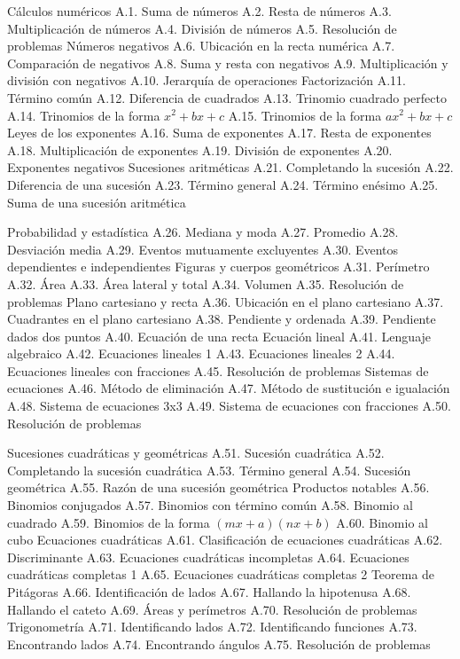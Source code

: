 Cálculos numéricos
A.1. Suma de números
A.2. Resta de números
A.3. Multiplicación de números
A.4. División de números
A.5. Resolución de problemas
Números negativos
A.6. Ubicación en la recta numérica
A.7. Comparación de negativos
A.8. Suma y resta con negativos
A.9. Multiplicación y división con negativos
A.10. Jerarquía de operaciones
Factorización
A.11. Término común
A.12. Diferencia de cuadrados
A.13. Trinomio cuadrado perfecto
A.14. Trinomios de la forma $x^2+bx+c$
A.15. Trinomios de la forma $ax^2+bx+c$
Leyes de los exponentes
A.16. Suma de exponentes
A.17. Resta de exponentes
A.18. Multiplicación de exponentes
A.19. División de exponentes
A.20. Exponentes negativos
Sucesiones aritméticas
A.21. Completando la sucesión
A.22. Diferencia de una sucesión
A.23. Término general
A.24. Término enésimo
A.25. Suma de una sucesión aritmética

Probabilidad y estadística
A.26. Mediana y moda
A.27. Promedio
A.28. Desviación media
A.29. Eventos mutuamente excluyentes
A.30. Eventos dependientes e independientes
Figuras y cuerpos geométricos
A.31. Perímetro
A.32. Área
A.33. Área lateral y total
A.34. Volumen
A.35. Resolución de problemas
Plano cartesiano y recta
A.36. Ubicación en el plano cartesiano
A.37. Cuadrantes en el plano cartesiano
A.38. Pendiente y ordenada
A.39. Pendiente dados dos puntos
A.40. Ecuación de una recta
Ecuación lineal
A.41. Lenguaje algebraico
A.42. Ecuaciones lineales 1
A.43. Ecuaciones lineales 2
A.44. Ecuaciones lineales con fracciones
A.45. Resolución de problemas
Sistemas de ecuaciones
A.46. Método de eliminación
A.47. Método de sustitución e igualación
A.48. Sistema de ecuaciones 3x3
A.49. Sistema de ecuaciones con fracciones
A.50. Resolución de problemas

Sucesiones cuadráticas y geométricas
A.51. Sucesión cuadrática
A.52. Completando la sucesión cuadrática
A.53. Término general
A.54. Sucesión geométrica
A.55. Razón de una sucesión geométrica
Productos notables
A.56. Binomios conjugados
A.57. Binomios con término común
A.58. Binomio al cuadrado
A.59. Binomios de la forma $(mx+a)(nx+b)$
A.60. Binomio al cubo
Ecuaciones cuadráticas
A.61. Clasificación de ecuaciones cuadráticas
A.62. Discriminante
A.63. Ecuaciones cuadráticas incompletas
A.64. Ecuaciones cuadráticas completas 1
A.65. Ecuaciones cuadráticas completas 2
Teorema de Pitágoras
A.66. Identificación de lados
A.67. Hallando la hipotenusa
A.68. Hallando el cateto
A.69. Áreas y perímetros
A.70. Resolución de problemas
Trigonometría
A.71. Identificando lados
A.72. Identificando funciones
A.73. Encontrando lados
A.74. Encontrando ángulos
A.75. Resolución de problemas